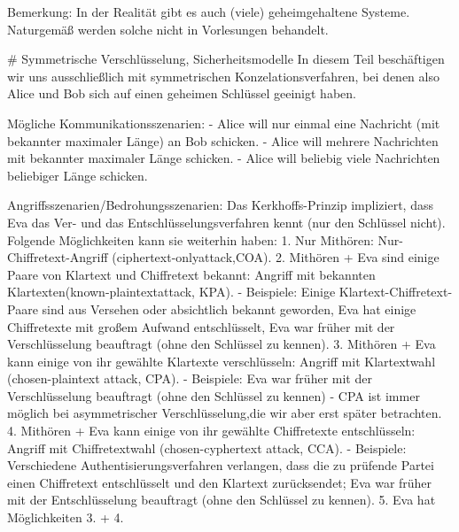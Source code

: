 \documentclass[a4paper]{article}
\begin{document}
\begin{multicols}{3}
    Bemerkung: In der Realität gibt es auch (viele) geheimgehaltene Systeme. Naturgemäß werden solche nicht in Vorlesungen behandelt.

    # Symmetrische Verschlüsselung, Sicherheitsmodelle
    In diesem Teil beschäftigen wir uns ausschließlich mit symmetrischen Konzelationsverfahren, bei denen also Alice und Bob sich auf einen geheimen Schlüssel geeinigt haben.

    Mögliche Kommunikationsszenarien:
    - Alice will nur einmal eine Nachricht (mit bekannter maximaler Länge) an Bob schicken.
    - Alice will mehrere Nachrichten mit bekannter maximaler Länge schicken.
    - Alice will beliebig viele Nachrichten beliebiger Länge schicken.

    Angriffsszenarien/Bedrohungsszenarien:
    Das Kerkhoffs-Prinzip impliziert, dass Eva das Ver- und das Entschlüsselungsverfahren kennt (nur den Schlüssel nicht). Folgende Möglichkeiten kann sie weiterhin haben:
    1. Nur Mithören: Nur-Chiffretext-Angriff (ciphertext-onlyattack,COA).
    2. Mithören + Eva sind einige Paare von Klartext und Chiffretext bekannt: Angriff mit bekannten Klartexten(known-plaintextattack, KPA).
    - Beispiele: Einige Klartext-Chiffretext-Paare sind aus Versehen oder absichtlich bekannt geworden, Eva hat einige Chiffretexte mit großem Aufwand entschlüsselt, Eva war früher mit der Verschlüsselung beauftragt (ohne den Schlüssel zu kennen).
    3. Mithören + Eva kann einige von ihr gewählte Klartexte verschlüsseln: Angriff mit Klartextwahl (chosen-plaintext attack, CPA).
    - Beispiele: Eva war früher mit der Verschlüsselung beauftragt (ohne den Schlüssel zu kennen)
    - CPA ist immer möglich bei asymmetrischer Verschlüsselung,die wir aber erst später betrachten.
    4. Mithören + Eva kann einige von ihr gewählte Chiffretexte entschlüsseln: Angriff mit Chiffretextwahl (chosen-cyphertext attack, CCA).
    - Beispiele: Verschiedene Authentisierungsverfahren verlangen, dass die zu prüfende Partei einen Chiffretext entschlüsselt und den Klartext zurücksendet; Eva war früher mit der Entschlüsselung beauftragt (ohne den Schlüssel zu kennen).
    5. Eva hat Möglichkeiten 3. + 4.


\end{multicols}
\end{document}
